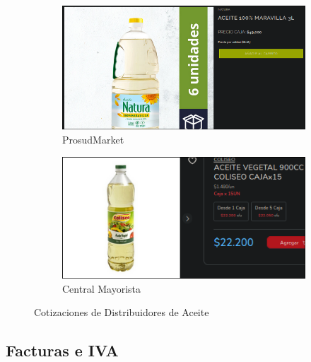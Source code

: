\documentclass[12pt]{article}
\begin{document}
        \begin{figure}[H] %
            \centering
            \begin{subfigure}{0.45\textwidth}
                \centering
                \includegraphics[width=0.9\linewidth]{prosud} %
                \caption{ProsudMarket}
                \label{fig:prosudmarket}
            \end{subfigure}
            \hfill
            \begin{subfigure}{0.45\textwidth}
                \centering
                \includegraphics[width=0.9\linewidth]{aceite} %
                \caption{Central Mayorista}
                \label{fig:central_mayorista_aceite}
            \end{subfigure}
            \caption{Cotizaciones de Distribuidores de Aceite}
            \label{fig:cotizaciones_aceite}
        \end{figure} %
        
        \newpage 

    \subsection{Facturas e IVA} 
\end{document}
